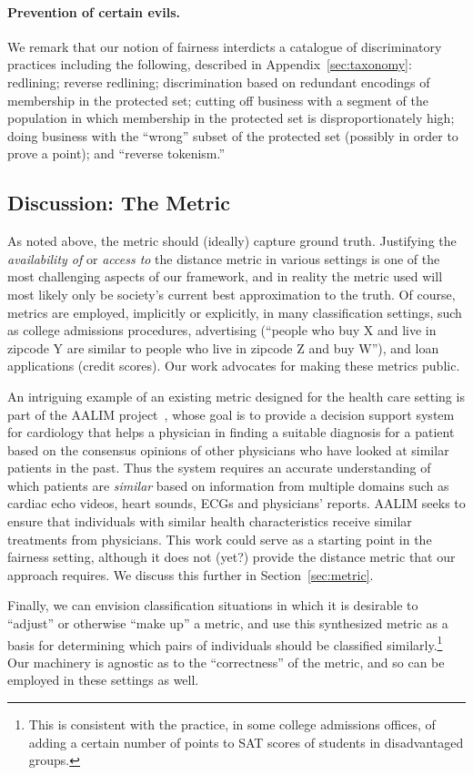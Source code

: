 \documentclass[letterpaper,11pt]{article}
\theoremstyle{definition}
\begin{document}
\paragraph{Prevention of certain evils.}
We remark that our notion of fairness interdicts a catalogue of discriminatory
practices including the following, described
 in Appendix~\ref{sec:taxonomy}: redlining; reverse redlining;
discrimination based on redundant encodings of membership in the protected
set; cutting off business with a segment of the population in which membership
in the protected set is disproportionately high; doing business with the
``wrong'' subset of the protected set (possibly in order to prove a point);
and ``reverse tokenism.''

\subsection{Discussion: The Metric}
As noted above, the metric should (ideally) capture ground truth.
Justifying the {\em availability of} or {\em access to} 
the distance metric in various settings
is one of the most challenging aspects of our framework,
and in reality the metric used will most likely only be society's 
current best approximation to the truth.
Of course, metrics are employed, implicitly or explicitly, in
many classification settings, such as college admissions procedures,
advertising (``people who buy X and live in zipcode Y are similar to
people who live in zipcode Z and buy W''), and loan applications
(credit scores).  Our work advocates for making these metrics public.

An intriguing example of an existing metric designed for the health
care setting is part of the AALIM project~\cite{AALIM},
whose goal is
to provide a decision support system for cardiology that
helps a physician in finding a suitable diagnosis for a patient based
on the consensus opinions of other physicians who have looked at
similar patients in the past. Thus the system requires an accurate
understanding of which patients are \emph{similar} based on information from
multiple domains such as cardiac echo videos, heart sounds, ECGs and
physicians' reports.  AALIM seeks to ensure that individuals with similar
health characteristics receive similar treatments from physicians. This work
could serve as a starting point in the fairness setting, although it does not
(yet?) provide the distance metric that our approach requires.  We discuss
this further in Section~\ref{sec:metric}.

Finally, we can envision classification situations in which
it is desirable to ``adjust'' or
otherwise ``make up'' a metric, and use this synthesized
metric as a basis for determining which pairs of individuals should
be classified similarly.\footnote{%
This is consistent with the practice, in some college admissions offices,
of adding a certain number of points to SAT scores of students in 
disadvantaged groups.}  Our machinery is agnostic as to the ``correctness''
of the metric, and so can be employed in these settings as well.
\end{document}
